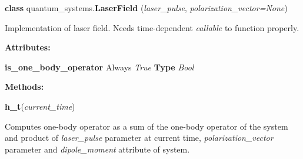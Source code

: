 \begin{tcolorbox}
    {\selectfont
    \textbf{class} quantum\_systems.\textbf{LaserField}
    (\emph{laser\_pulse}, \emph{polarization\_vector=None})

    \vspace{1em}
    Implementation of laser field. Needs time-dependent \emph{callable}
    to function properly.

    \vspace{1em}
    \textbf{Attributes:}
    
    \hspace{2em}\textbf{is\_one\_body\_operator} 
    Always \emph{True} 
    \textbf{Type} \emph{Bool}

    \vspace{1em} 
    \textbf{Methods:}

    \hspace{2em} \textbf{h\_t}(\emph{current\_time})
        \begin{adjustwidth}{4em}{}
            Computes one-body operator as a sum of the one-body operator of the 
            system and product of \emph{laser\_pulse} parameter at current time,
            \emph{polarization\_vector} parameter and \emph{dipole\_moment} 
            attribute of system.
        \end{adjustwidth}

    }
\end{tcolorbox}